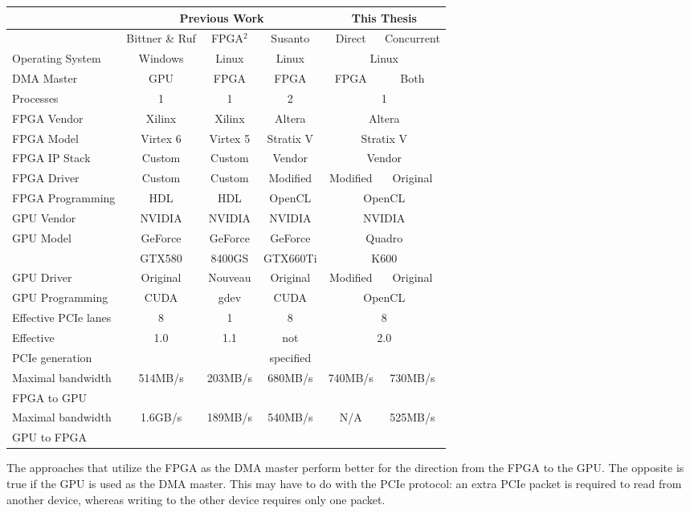 \begin{center}
\begin{tabular}{| l || c| c |c|| c | c |}
	\hline
		&	\multicolumn{3}{c||}{Previous Work} & \multicolumn{2}{c|}{This Thesis}\\
	\hline
		&	Bittner \& Ruf & FPGA$^2$ & Susanto & Direct & Concurrent\\
	\hline\hline
	Operating System & Windows & Linux & Linux & \multicolumn{2}{c|}{Linux}\\
	\hline
	DMA Master & GPU & FPGA & FPGA & FPGA & Both \\
	\hline
	Processes & 1 & 1 & 2 & \multicolumn{2}{c|}{1}\\
	\hline
	FPGA Vendor & Xilinx & Xilinx & Altera & \multicolumn{2}{c|}{Altera}\\
	\hline
	FPGA Model & Virtex 6 & Virtex 5 & Stratix V & \multicolumn{2}{c|}{Stratix V}\\
	\hline
	FPGA IP Stack & Custom & Custom & Vendor & \multicolumn{2}{c|}{Vendor} \\
	\hline
	FPGA Driver & Custom & Custom & Modified & Modified & Original\\
	\hline
	FPGA Programming & HDL & HDL & OpenCL & \multicolumn{2}{c|}{OpenCL}\\
	\hline
	GPU Vendor & NVIDIA & NVIDIA & NVIDIA & \multicolumn{2}{c|}{NVIDIA}\\
	\hline
	GPU Model & GeForce& GeForce & GeForce & \multicolumn{2}{c|}{Quadro}\\
	&  GTX580 & 8400GS & GTX660Ti &  \multicolumn{2}{c|}{K600}\\
	\hline
	GPU Driver & Original & Nouveau & Original & Modified & Original \\
	\hline
	GPU Programming & CUDA & gdev & CUDA & \multicolumn{2}{c|}{OpenCL}\\
	\hline
	Effective PCIe lanes & 8 & 1 & 8 & \multicolumn{2}{c|}{8}\\
	\hline
	Effective & 1.0 & 1.1 & not & \multicolumn{2}{c|}{2.0}\\
	PCIe generation & & & specified & \multicolumn{2}{c|}{} \\
	\hline
	\hline
	Maximal bandwidth & 514MB/s & 203MB/s & 680MB/s & 740MB/s & 730MB/s\\
	FPGA to GPU & & & & &\\
	\hline
	Maximal bandwidth & 1.6GB/s & 189MB/s & 540MB/s & N/A & 525MB/s\\
	GPU to FPGA & & & & &\\
	\hline
\end{tabular}
\end{center}

The approaches that utilize the FPGA as the DMA master perform better for the direction from the FPGA to the GPU.
The opposite is true if the GPU is used as the DMA master.
This may have to do with the PCIe protocol: an extra PCIe packet is required to read from another device, whereas writing to the other device requires only one packet.




